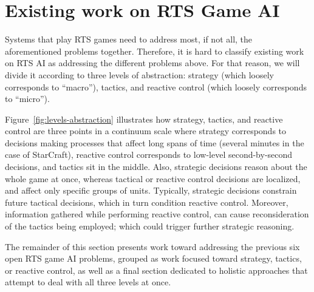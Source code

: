 \documentclass{llncs}
\begin{document}
\section*{Existing work on RTS Game AI}\label{sec:review}

Systems that  play RTS  games need  to address most,  if not  all, the
aforementioned problems  together. Therefore,  it is hard  to classify
existing  work  on  RTS  AI   as  addressing  the  different  problems
above. For that reason, %
we will divide  it according to three levels  of abstraction: strategy
(which loosely corresponds to ``macro''), tactics, and reactive control
(which loosely corresponds to ``micro'').

Figure~\ref{fig:levels-abstraction}   illustrates   how
strategy, tactics, and reactive control are three points in a continuum
scale where  strategy corresponds  to decisions making  processes that
affect long spans of time (several  minutes in the case of StarCraft),
reactive control corresponds  to low-level second-by-second decisions,
and tactics sit in the  middle. Also, strategic decisions reason about
the whole game at once, whereas tactical or reactive control decisions
are localized,  and affect only  specific groups of  units. Typically,
strategic decisions constrain future tactical decisions, which in turn
condition  reactive  control.  Moreover,  information  gathered  while
performing reactive control, can  cause reconsideration of the tactics
being employed; which could trigger further strategic reasoning.

The remainder of this section presents work toward addressing the previous six open RTS game AI problems, grouped as work focused toward strategy, tactics, or reactive control, as well as a final section dedicated to holistic approaches that attempt to deal with all three levels at once.

\end{document}
